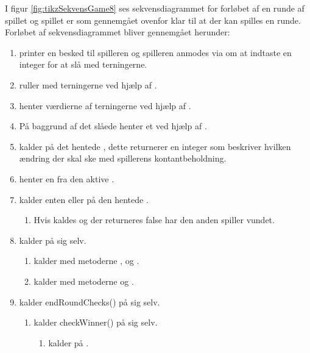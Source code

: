 I figur \vref{fig:tikzSekvensGame8} ses sekvensdiagrammet for forløbet af en runde af spillet og spillet er som gennemgået ovenfor klar til at der kan spilles en runde. Forløbet af sekvensdiagrammet bliver gennemgået herunder:
\begin{enumerate}
\item {} printer en besked til spilleren og spilleren anmodes via  om at indtaste en integer for at slå med terningerne.
\item {} ruller med terningerne  ved hjælp af .
\item {} henter værdierne af terningerne  ved hjælp af .
\item På baggrund af det slåede henter  et  ved hjælp af .
\item {} kalder  på det hentede , dette returnerer en integer som beskriver hvilken ændring der skal ske med spillerens kontantbeholdning.
\item {} henter en  fra den aktive .
\item {} kalder enten  eller  på den hentede .
\begin{enumerate}
\item Hvis  kaldes og der returneres false har den anden spiller vundet.
\end{enumerate}
\item {} kalder  på sig selv.
\begin{enumerate}
\item {} kalder  med metoderne ,  og .
\item {} kalder  med metoderne  og .
\end{enumerate}
\item {} kalder endRoundChecks() på sig selv.
\begin{enumerate}
\item {} kalder checkWinner() på sig selv.
\begin{enumerate}
\item {} kalder  på .

\end{enumerate}
\end{enumerate}
\end{enumerate}
